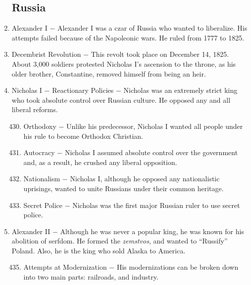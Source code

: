 \documentclass[12pt]{article}
\begin{document}
\begin{enumerate}
\subsection{Russia}

\item Alexander I $-$ Alexander I was a czar of Russia who wanted to liberalize. His attempts failed because of the Napoleonic wars. He ruled from 1777 to 1825.

\item Decembrist Revolution $-$ This revolt took place on December 14, 1825. About 3,000 soldiers protested Nicholas I's ascension to the throne, as his older brother, Constantine, removed himself from being an heir.

\item Nicholas I $-$ Reactionary Policies $-$ Nicholas was an extremely strict king who took absolute control over Russian culture. He opposed any and all liberal reforms.

\begin{enumerate}[label=\arabic{*}.]
\setcounter{enumii}{429}

\item Orthodoxy $-$ Unlike his predecessor, Nicholas I wanted all people under his rule to become Orthodox Christian. 

\item Autocracy $-$ Nicholas I assumed absolute control over the government and, as a result, he crushed any liberal opposition.

\item Nationalism $-$ Nicholas I, although he opposed any nationalistic uprisings, wanted to unite Russians under their common heritage.

\item Secret Police $-$ Nicholas was the first major Russian ruler to use secret police.

\end{enumerate}

\setcounter{enumi}{433}

\item Alexander II $-$ Although he was never a popular king, he was known for his abolition of serfdom. He formed the \textit{zemstvos}, and wanted to ``Russify'' Poland. Also, he is the king who sold Alaska to America.

\begin{enumerate}[label=\arabic{*}.]
\setcounter{enumii}{434}

\item Attempts at Modernization $-$ His modernizations can be broken down into two main parts: railroads, and industry.


\end{enumerate}
\end{enumerate}
\end{document}
